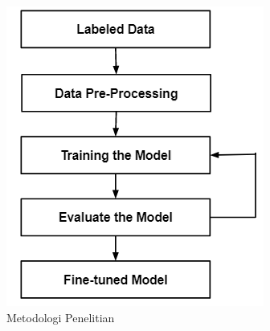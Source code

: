     \begin{figure} [H] \centering
      \includegraphics[scale=1]{gambar/Metodologi.png}
      \caption{Metodologi Penelitian}
      \label{fig:Metodologi}
    \end{figure}

